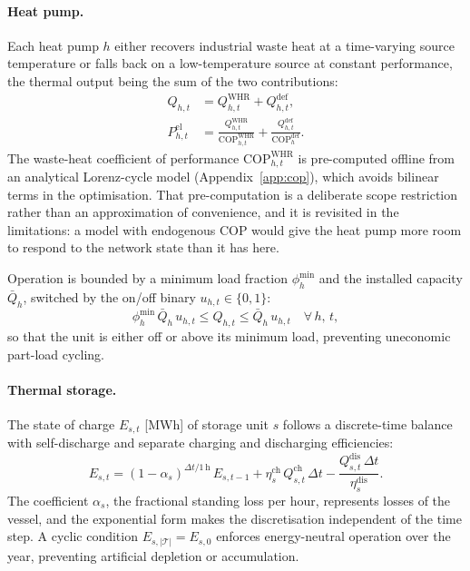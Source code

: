 \paragraph{Heat pump.}
Each heat pump $h$ either recovers industrial waste heat at a time-varying source
temperature or falls back on a low-temperature source at constant performance, the
thermal output being the sum of the two contributions:
%
\begin{align}
  Q_{h,t} &= Q_{h,t}^{\mathrm{WHR}} + Q_{h,t}^{\mathrm{def}},
  \label{eq:hp_split} \\[4pt]
  P_{h,t}^{\mathrm{el}} &= \frac{Q_{h,t}^{\mathrm{WHR}}}{
    \mathrm{COP}_{h,t}^{\mathrm{WHR}}}
    + \frac{Q_{h,t}^{\mathrm{def}}}{\mathrm{COP}_h^{\mathrm{def}}}.
  \label{eq:hp_pel}
\end{align}
%
The waste-heat coefficient of performance $\mathrm{COP}_{h,t}^{\mathrm{WHR}}$ is
pre-computed offline from an analytical Lorenz-cycle model
(Appendix~\ref{app:cop}), which avoids bilinear terms in the optimisation. That
pre-computation is a deliberate scope restriction rather than an approximation of
convenience, and it is revisited in the limitations: a model with endogenous COP would
give the heat pump more room to respond to the network state than it has here.

Operation is bounded by a minimum load fraction $\phi_h^{\mathrm{min}}$ and the installed
capacity $\bar{Q}_h$, switched by the on/off binary $u_{h,t} \in \{0,1\}$:
%
\begin{equation}
  \phi_h^{\mathrm{min}}\, \bar{Q}_h\, u_{h,t}
  \leq Q_{h,t} \leq \bar{Q}_h\, u_{h,t}
  \quad \forall\, h,\, t,
  \label{eq:hp_cap}
\end{equation}
%
so that the unit is either off or above its minimum load, preventing uneconomic part-load
cycling.

\paragraph{Thermal storage.}
The state of charge $E_{s,t}$ [MWh] of storage unit $s$ follows a discrete-time balance
with self-discharge and separate charging and discharging efficiencies:
%
\begin{equation}
  E_{s,t} = (1 - \alpha_s)^{\Delta t/\mathrm{1\,h}}\, E_{s,t-1}
    + \eta_s^{\mathrm{ch}}\, Q_{s,t}^{\mathrm{ch}}\, \Delta t
    - \frac{Q_{s,t}^{\mathrm{dis}}\, \Delta t}{\eta_s^{\mathrm{dis}}}.
  \label{eq:storage_soc}
\end{equation}
%
The coefficient $\alpha_s$, the fractional standing loss per hour, represents losses of
the vessel, and the exponential form makes the discretisation independent of the time step.
A cyclic condition $E_{s,|\mathcal{T}|} = E_{s,0}$ enforces energy-neutral operation over
the year, preventing artificial depletion or accumulation.

